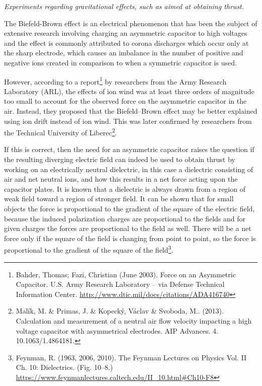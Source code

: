 \documentclass[a4paper]{article}
\newcommand\textstyleNone[1]{#1}
\newcommand\textstyleHyperlinkii[1]{#1}
\begin{document}
{
\textstyleNone{\textit{{Experiments regarding gravitational effects,
such as aimed at obtaining thrust.}}}}

{
\textstyleNone{{The Biefeld-Brown effect is an electrical phenomenon
that has been the subject of extensive research involving charging an asymmetric capacitor to high voltages and the
effect is commonly attributed to corona discharges which occur only at the sharp electrode, which causes an imbalance
in the number of positive and negative ions created in comparison to when a symmetric capacitor is used. }}}

{
\textstyleNone{{However, according to a
report}}\footnote{\textstyleNone{ Bahder, Thomas; Fazi, Christian (June 2003). Force on an Asymmetric Capacitor. U.S.
Army Research Laboratory -- via Defense Technical Information Center.
}\url{http://www.dtic.mil/docs/citations/ADA416740}\textstyleHyperlinkii{ }\textstyleNone{ }\par
}\textstyleNone{{ by researchers from the Army Research Laboratory
(ARL), the effects of ion wind was at least three orders of magnitude too small to account for the observed force on
the asymmetric capacitor in the air. Instead, they proposed that the Biefeld--Brown effect may be better explained
using ion drift instead of ion wind. This was later confirmed by researchers from the Technical University of
Liberec}}\footnote{\textstyleNone{ Mal\'ik, M. \& Primas, J. \& Kopeck\'y, V\'aclav \& Svoboda, M.. (2013). Calculation
and measurement of a neutral air flow velocity impacting a high voltage capacitor with asymmetrical electrodes. AIP
Advances. 4. 10.1063/1.4864181. }\par }\textstyleNone{{. }}}

{
\textstyleNone{{If this is correct, then the need for an asymmetric
capacitor raises the question if the resulting diverging electric field can indeed be used to obtain thrust by working
on an electrically neutral dielectric, in this case a dielectric consisting of air and net neutral ions, and how this
results in a net force acting upon the capacitor plates. It is known that a dielectric is always drawn from a region of
weak field toward a region of stronger field. It can be shown that for small objects the force is proportional to the
gradient of the square of the electric field, because the induced polarization charges are proportional to the fields
and for given charges the forces are proportional to the field as well. There will be a net force only if the square of
the field is changing from point to point, so the force is proportional to the gradient of the square of the
field}}\footnote{ Feynman, R. (1963, 2006, 2010). The Feynman Lectures on Physics Vol. II Ch. 10: Dielectrics. (Fig.
10--8.) \url{https://www.feynmanlectures.caltech.edu/II_10.html\#Ch10-F8}  \par
}\textstyleNone{{.}}}
\end{document}
